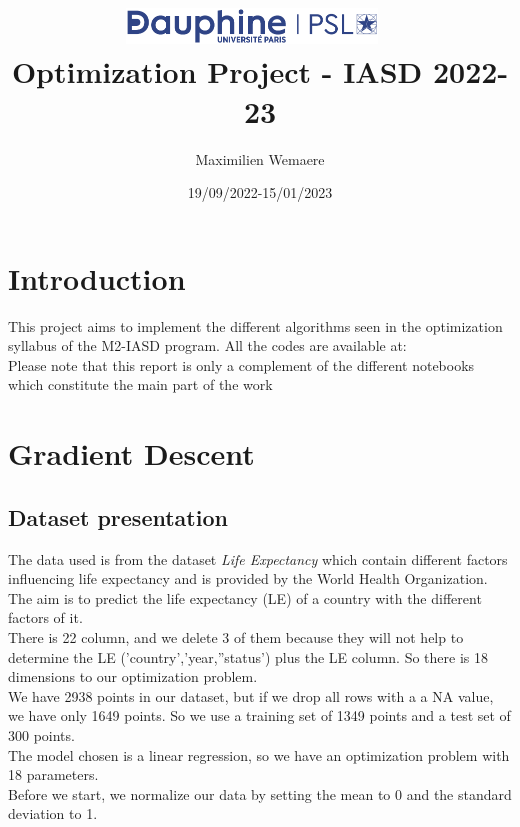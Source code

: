 \documentclass{article}
\title{%
\includegraphics[width=0.5\textwidth]{dauphine.png}~ 
\\[3cm]
Optimization Project - IASD 2022-23 \\ }
\author{Maximilien Wemaere}
\date{19/09/2022-15/01/2023}
\begin{document}
\maketitle

\tableofcontents

\newpage

\section*{Introduction}

This project aims to implement the different algorithms seen in the optimization syllabus of the M2-IASD program. All the codes are available at:  \\ 

Please note that this report is only a complement of the different notebooks which constitute the main part of the work

\section{Gradient Descent}

\subsection{Dataset presentation}
    The data used is from the dataset \textit{Life Expectancy} which contain different factors influencing life expectancy and is provided by the World Health Organization. The aim is to predict the life expectancy (LE) of a country with the different factors of it. \\
    
    There is 22 column, and we delete 3 of them because they will not help to determine the LE ('country','year,''status') plus the LE column. So there is 18 dimensions to our optimization problem. \\

    We have 2938 points in our dataset, but if we drop all rows with a a NA value, we have only 1649 points. So we use a training set of 1349 points and a test set of 300 points. \\

    The model chosen is a linear regression, so we have an optimization problem with 18 parameters. \\

    Before we start, we normalize our data by setting the mean to 0 and the standard deviation to 1. \\
\end{document}
